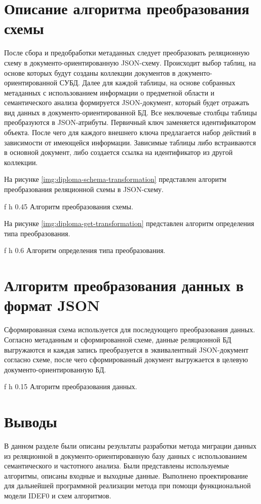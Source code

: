 \section{Описание алгоритма преобразования схемы}
После сбора и предобработки метаданных следует преобразовать реляционную схему в документо-ориентированную JSON-схему.
Происходит выбор таблиц, на основе которых будут созданы коллекции документов в документо-ориентированной СУБД.
Далее для каждой таблицы, на основе собранных метаданных с использованием информации о предметной области и семантического анализа формируется JSON-документ,
который будет отражать вид данных в документо-ориентированной БД.
Все неключевые столбцы таблицы преобразуются в JSON-атрибуты. 
Первичный ключ заменяется идентификатором объекта.
После чего для каждого внешнего ключа предлагается набор действий в зависимости от имеющейся информации.
Зависимые таблицы либо встраиваются в основной документ, либо создается ссылка на идентификатор из другой коллекции.

На рисунке \ref{img:diploma-schema-transformation} представлен алгоритм преобразования реляционной схемы в JSON-схему.

    {f}
    {h}
    {0.45\textwidth}
{Алгоритм преобразования схемы.}

\clearpage

На рисунке \ref{img:diploma-get-transformation} представлен алгоритм определения типа преобразования.

    {f}
    {h}
    {0.6\textwidth}
{Алгоритм определения типа преобразования.}



\clearpage

\section{Алгоритм преобразования данных в формат JSON}
Сформированная схема используется для последующего преобразования данных.
Согласно метаданным и сформированной схеме, 
данные реляционной БД выгружаются и каждая запись преобразуется в эквивалентный JSON-документ согласно схеме,
после чего сформированный документ выгружается в целевую документо-ориентированную БД.

    {f}
    {h}
    {0.15\textwidth}
{Алгоритм преобразования данных.}

\clearpage

\section*{Выводы}
В данном разделе были описаны результаты разработки
метода миграции данных из реляционной в документо-ориентированную базу данных
с использованием семантического и частотного анализа.
Были представлены используемые алгоритмы, описаны входные и выходные данные.
Выполнено проектирование для дальнейшей программной реализации метода при помощи 
функциональной модели IDEF0 и схем алгоритмов.
